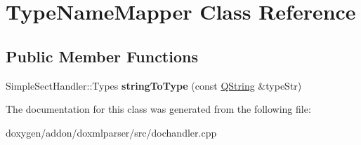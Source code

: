 \hypertarget{class_type_name_mapper}{}\section{Type\+Name\+Mapper Class Reference}
\label{class_type_name_mapper}
\subsection*{Public Member Functions}
\begin{DoxyCompactItemize}
\item 
\mbox{\label{class_type_name_mapper_ac50b818f9e512654125efd3749800425}} 
Simple\+Sect\+Handler\+::\+Types {\bfseries string\+To\+Type} (const \mbox{\hyperlink{class_q_string}{Q\+String}} \&type\+Str)
\end{DoxyCompactItemize}


The documentation for this class was generated from the following file\+:\begin{DoxyCompactItemize}
\item 
doxygen/addon/doxmlparser/src/dochandler.\+cpp\end{DoxyCompactItemize}
